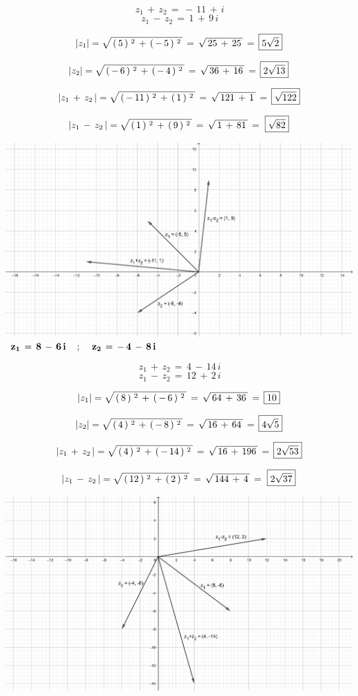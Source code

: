 \documentclass[a4paper,11pt,openany]{book}
\begin{document}
$$\,{z_1}\,+\,{z_2}\,=\,-\,11\,+\,i$$
$$\,{z_1}\,-\,{z_2}\,=\,1\,+\,9\,i$$

$$\lvert z_1\rvert = \sqrt{\,(\,5\,)\,^{\,2}\,+\,(\,-\,5\,)\,^{\,2}\,}\,=\,\sqrt{\,25\,+\,25\,}\,=\,\boxed{5\sqrt{2}}$$

$$\lvert z_2\rvert = \sqrt{\,(\,-\,6\,)\,^{\,2}\,+\,(\,-\,4\,)\,^{\,2}\,}\,=\,\sqrt{\,36\,+\,16\,}\,=\,\boxed{2\sqrt{13}}$$

$$\lvert z_1\,+\,{z_2}\,\rvert = \sqrt{\,(\,-\,11\,)\,^{\,2}\,+\,(\,1\,)\,^{\,2}\,}\,=\,\sqrt{\,121\,+\,1\,}\,=\,\boxed{\sqrt{122}}$$

$$\lvert z_1\,-\,{z_2}\,\rvert = \sqrt{\,(\,1\,)\,^{\,2}\,+\,(\,9\,)\,^{\,2}\,}\,=\,\sqrt{\,1\,+\,81\,}\,=\,\,\boxed{\sqrt{82}}$$

\includegraphics[width=15cm]{geo2}
\\

\textcolor{ao(english)}{}\,\quad\,$\bf{z_{1}\,=\,8\,-\,6\,i \quad\,;\,\quad z_{2}\,=\,-\,4\,-\,8\,i}$

$$\,{z_1}\,+\,{z_2}\,=\,4\,-\,14\,i$$
$$\,{z_1}\,-\,{z_2}\,=\,12\,+\,2\,i$$

$$\lvert z_1\rvert = \sqrt{\,(\,8\,)\,^{\,2}\,+\,(\,-\,6\,)\,^{\,2}\,}\,=\,\sqrt{\,64\,+\,36\,}\,=\,\boxed{10}$$

$$\lvert z_2\rvert = \sqrt{\,(\,4\,)\,^{\,2}\,+\,(\,-\,8\,)\,^{\,2}\,}\,=\,\sqrt{\,16\,+\,64\,}\,=\,\boxed{4\sqrt{5}}$$

$$\lvert z_1\,+\,{z_2}\,\rvert = \sqrt{\,(\,4\,)\,^{\,2}\,+\,(\,-\,14\,)\,^{\,2}\,}\,=\,\sqrt{\,16\,+\,196\,}\,=\,\boxed{2\sqrt{53}}$$

$$\lvert z_1\,-\,{z_2}\,\rvert = \sqrt{\,(\,12\,)\,^{\,2}\,+\,(\,2\,)\,^{\,2}\,}\,=\,\sqrt{\,144\,+\,4\,}\,=\,\,\boxed{2\sqrt{37}}$$

\includegraphics[width=15cm]{geo3}
\end{document}
